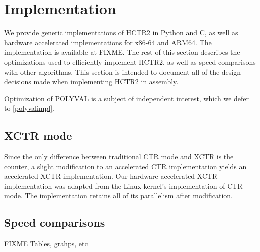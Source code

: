 \documentclass[hctr.tex]{subfiles}
\begin{document}
\section{Implementation}\label{implementation}
We provide generic implementations of HCTR2 in Python and C, as well as hardware accelerated implementations for x86-64 and ARM64. The implementation is available at {\color{red} FIXME}. The rest of this section describes the optimizations used to efficiently implement HCTR2, as well as speed comparisons with other algorithms. This section is intended to document all of the design decisions made when implementing HCTR2 in assembly.

Optimization of POLYVAL is a subject of independent
interest, which we defer to \autoref{polyvalimpl}.

\subsection{XCTR mode}
Since the only difference between traditional CTR mode and XCTR is the counter, a slight modification to an accelerated CTR implementation yields an accelerated XCTR implementation. Our hardware accelerated XCTR implementation was adapted from the Linux kernel's implementation of CTR mode. The implementation retains all of its parallelism after modification. 

\subsection{Speed comparisons}
{\color{red} FIXME Tables, grahps, etc}
\end{document}

